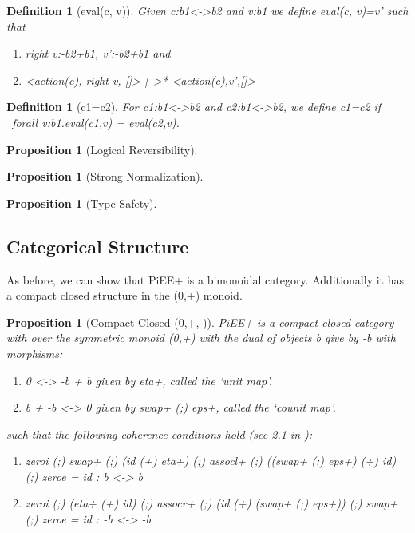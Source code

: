 \documentclass[preprint]{sigplanconf}
\newtheorem{definition}[theorem]{Definition}
\newtheorem{proposition}[theorem]{Proposition}
\begin{document}
\begin{definition}[{{eval(c, v)}}]
Given {{c:b1<->b2}} and {{v:b1}} we define {{eval(c, v)=v'}} such that
\begin{enumerate}
\item {{right v:-b2+b1}}, {{v':-b2+b1}} and
\item {{<action(c), right v, []> |-->* <action(c),v',[]>^^^}}
\end{enumerate}
\end{definition}

\begin{definition}[{{c1=c2}}]
  For {{c1:b1<->b2}} and {{c2:b1<->b2}}, we define {{c1=c2}} if
  {{~forall v:b1.eval(c1,v) = eval(c2,v)}}.
\end{definition}

\begin{proposition}[Logical Reversibility]
  
\end{proposition}

\begin{proposition}[Strong Normalization]
  
\end{proposition}

\begin{proposition}[Type Safety]
  
\end{proposition}

\subsection{Categorical Structure}

As before, we can show that {{PiEE+}} is a bimonoidal
category. Additionally it has a compact closed structure in the
{{(0,+)}} monoid.

\begin{proposition}[Compact Closed {{(0,+,-)}}]
  {{PiEE+}} is a compact closed category with over the symmetric
  monoid {{(0,+)}} with the dual of objects {{b}} give by {{-b}} with
  morphisms:

\begin{enumerate}
\item {{0 <-> -b + b}} given by {{eta+}}, called the `unit map'.
\item {{b + -b <-> 0}} given by {{swap+ (;) eps+}}, called the `counit map'.
\end{enumerate}

\noindent
such that the following coherence conditions hold (see 2.1 in
\cite{selinger2007dagger}):


\begin{enumerate}
\item {{zeroi (;) swap+ (;) (id (+) eta+) (;) assocl+ (;) ((swap+ (;) eps+) (+) id) (;) zeroe = id : b <-> b}}
\item {{zeroi (;) (eta+ (+) id) (;) assocr+ (;) (id (+) (swap+ (;) eps+)) (;) swap+ (;) zeroe = id : -b <-> -b}}
\end{enumerate}

\end{proposition}
\end{document}
